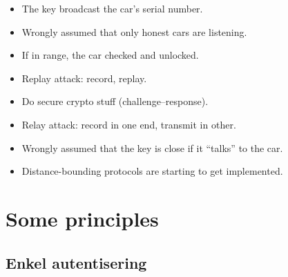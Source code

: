 \begin{frame}
  \begin{example}
    \begin{itemize}
      \item The key broadcast the car's serial number.
      \item Wrongly assumed that only honest cars are listening.
      \item If in range, the car checked and unlocked.
    \end{itemize}
  \end{example}

  \pause

  \begin{remark}
    \begin{itemize}
      \item Replay attack: record, replay.
    \end{itemize}
  \end{remark}
\end{frame}

\begin{frame}
  \begin{example}
    \begin{itemize}
      \item Do secure crypto stuff (challenge--response).
    \end{itemize}
  \end{example}

  \pause

  \begin{remark}
    \begin{itemize}
      \item Relay attack: record in one end, transmit in other.
      \item Wrongly assumed that the key is close if it \enquote{talks} to the 
        car.
      \item Distance-bounding protocols are starting to get implemented.
    \end{itemize}
  \end{remark}
\end{frame}


\section{Some principles}

\subsection{Enkel autentisering}

